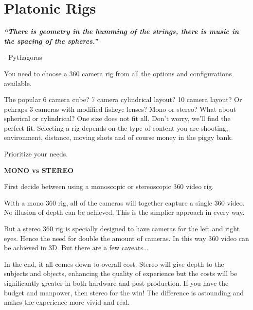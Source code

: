 \chapter{Platonic Rigs}
\pagecolor{white}
\label{chap:2}
\begin{fullwidth}

{\itshape\bfseries “There is geometry in the humming of the strings, there is music in the spacing of the spheres.”}

- Pythagoras
\vspace{\baselineskip}

\problem

{\large You need to choose a 360 camera rig from all the options and configurations available.
 \par}

The popular 6 camera cube? 7 camera cylindrical layout? 10 camera layout? Or pehraps 3 cameras with modified fisheye lenses? Mono or stereo? What about spherical or cylindrical? One size does not fit all. Don’t worry, we’ll find the perfect fit. Selecting a rig depends on the type of content you are shooting, environment, distance, moving shots and of course money in the piggy bank.

\solution

{\large Prioritize your needs.
 \par}

{\bfseries MONO vs STEREO}

\clearpage
First decide between using a monoscopic or stereoscopic 360 video rig. 

With a mono 360 rig, all of the cameras will together capture a single 360 video. No illusion of depth can be achieved. This is the simplier approach in every way.

But a stereo 360 rig is specially designed to have cameras for the left and right eyes. Hence the need for double the amount of cameras. In this way 360 video can be achieved in 3D. But there are a few caveats...

In the end, it all comes down to overall cost. Stereo will give depth to the subjects and objects, enhancing the quality of experience but the costs will be significantly greater in both hardware and post production. If you have the budget and manpower, then stereo for the win! The difference is astounding and makes the experience more vivid and real. 


\end{fullwidth}
